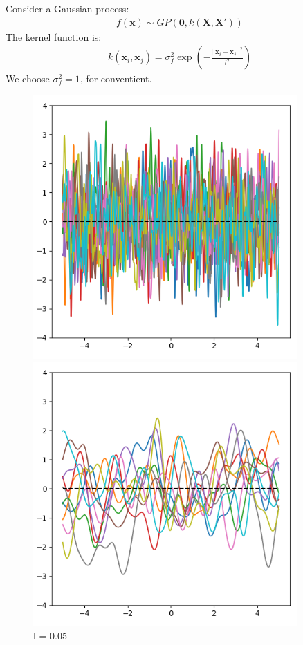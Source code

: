 \documentclass[12pt]{article}
\newenvironment{question}[2][Question]{\begin{trivlist}
\kern10pt
\item[\hskip \labelsep {\bfseries #1}\hskip \labelsep {\bfseries #2.}]}{\end{trivlist}}
\begin{document}
\begin{question}{10}
Consider a Gaussian process:
  \begin{align*}
    f(\mathbf{x}) \sim GP(\mathbf{0}, k(\mathbf{X}, \mathbf{X'}))
  \end{align*}
The kernel function is:
\begin{align*}
  k(\mathbf{x}_i, \mathbf{x}_j) = \sigma^2_f \exp(-\frac{||\mathbf{x}_i - \mathbf{x}_j||^2}{l^2})
\end{align*}
We choose $\sigma^2_f = 1$, for conventient.

\begin{figure}[h]
  \centering
  \begin{minipage}{0.45\textwidth}
      \centering
      \includegraphics[width=0.9\textwidth]{fig/Q10-l005.png} 
      \caption{l = 0.05}
  \end{minipage}\hfill
  \begin{minipage}{0.45\textwidth}
      \centering
      \includegraphics[width=0.9\textwidth]{fig/Q10-l050.png} 

\end{minipage}
\end{figure}
\end{question}
\end{document}

